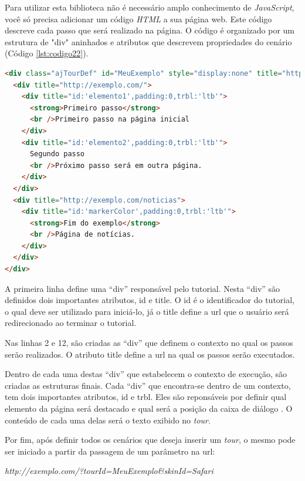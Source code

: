 Para utilizar esta biblioteca não é necessário amplo conhecimento de \textit{JavaScript}, você só precisa adicionar um código \textit{HTML} a sua página web. Este código descreve cada passo que será realizado na página. O código é organizado por um estrutura de "div" aninhados e atributos que descrevem propriedades do cenário (Código \ref{lst:codigo22}).

\pagebreak
{\singlespace
\begin{lstlisting}[caption=Estrutura do código \textit{HTML} do \textit{Amberjack},language=HTML,label={lst:codigo23}]
<div class="ajTourDef" id="MeuExemplo" style="display:none" title="http://feedback.exemplo.com/">
  <div title="http://exemplo.com/">
    <div title="id:'elemento1',padding:0,trbl:'ltb'">
      <strong>Primeiro passo</strong>
      <br />Primeiro passo na página inicial
    </div>
    <div title="id:'elemento2',padding:0,trbl:'ltb'">
      Segundo passo
      <br />Próximo passo será em outra página.
    </div>
  </div>
  <div title="http://exemplo.com/noticias">
    <div title="id:'markerColor',padding:0,trbl:'ltb'">
      <strong>Fim do exemplo</strong>
      <br />Página de notícias.
    </div>
  </div>
</div>
\end{lstlisting}
}

A primeira linha define uma ``div'' responsável pelo tutorial. Nesta ``div'' são definidos dois importantes atributos, id e title. O id é o identificador do tutorial, o qual deve ser utilizado para iniciá-lo, já o title define a url que o usuário será redirecionado ao terminar o tutorial.

Nas linhas 2 e 12, são criadas as ``div'' que definem o contexto no qual os passos serão realizados. O atributo title define a url na qual os passos serão executados.

Dentro de cada uma destas ``div'' que estabelecem o contexto de execução, são criadas as estruturas finais. Cada ``div'' que encontra-se dentro de um contexto, tem dois importantes atributos, id e trbl. Eles são reponsáveis por definir qual elemento da página será destacado e qual será a posição da caixa de diálogo \cite{AJ}. O conteúdo de cada uma delas será o texto exibido no \textit{tour}.

Por fim, após definir todos os cenários que deseja inserir um \textit{tour}, o mesmo pode ser iniciado a partir da passagem de um parâmetro na url:

\begin{center}
\textit{http://exemplo.com/?tourId=MeuExemplo\&skinId=Safari}
\end{center}







